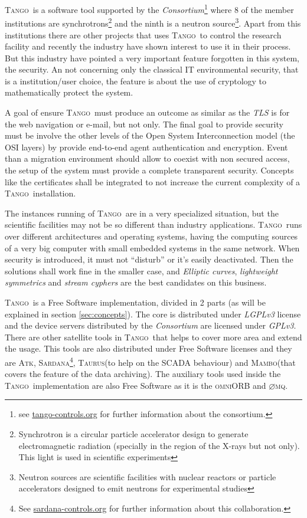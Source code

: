 \documentclass[10pt,a4paper,twoside]{llncs}
\newcommand{\tango}{\textsc{Tango}}
\newcommand{\atk}{\textsc{Atk}}
\newcommand{\sardana}{\textsc{Sardana}}
\newcommand{\taurus}{\textsc{Taurus}}
\newcommand{\mambo}{\textsc{Mambo}}
\newcommand{\omniorb}{\textsc{omniORB}}
\newcommand{\zmq}{\textsc{$\varnothing$mq}}
\begin{document}
\tango\, is a software tool supported by the \emph{Consortium}\footnote{see \href{https://www.tango-controls.org/}{tango-controls.org} for further information about the consortium.} where 8 of the member institutions are synchrotrons\footnote{Synchrotron is a circular particle accelerator design to generate electromagnetic radiation (specially in the region of the X-rays but not only). This light is used in scientific experiments} and the ninth is a neutron source\footnote{Neutron sources are scientific facilities with nuclear reactors or particle accelerators designed to emit neutrons for experimental studies}. Apart from this institutions there are other projects that uses \tango\, to control the research facility and recently the industry have shown interest to use it in their process. But this industry have pointed a very important feature forgotten in this system, the security. An not concerning only the classical IT environmental security, that is a institution/user choice, the feature is about the use 
of cryptology to mathematically protect the 
system.

A goal of ensure \tango\, must produce an outcome as similar as the \emph{TLS} is for the web navigation or e-mail, but not only. The final goal to provide security must be involve the other levels of the Open System Interconnection model (the OSI layers) by provide end-to-end agent authentication and encryption. Event than a migration environment should allow to coexist with non secured access, the setup of the system must provide a complete transparent security. Concepts like the certificates shall be integrated to not increase the current complexity of a \tango\, installation.

The instances running of \tango\, are in a very specialized situation, but the scientific facilities may not be so different than industry applications. \tango\, runs over different architectures and operating systems, having the computing sources of a very big computer with small embedded systems in the same network. When security is introduced, it must not ``disturb'' or it's easily deactivated. Then the solutions shall work fine in the smaller case, and \emph{Elliptic curves}, \emph{lightweight symmetrics} and \emph{stream cyphers} are the best candidates on this business.

\tango\, is a Free Software implementation, divided in 2 parts (as will be explained in section \ref{sec:concepts}). The core is distributed under \emph{LGPLv3} license and the device servers distributed by the \emph{Consortium} are licensed under \emph{GPLv3}. There are other satellite tools in \tango\, that helps to cover more area and extend the usage. This tools are also distributed under Free Software licenses and they are \atk, \sardana\footnote{See \href{https://www.sardana-controls.org/}{sardana-controls.org} for further information about this collaboration.}, \taurus (to help on the SCADA behaviour) and \mambo (that covers the feature of the data archiving). The auxiliary tools used inside the \tango\, implementation are also Free Software as it is the \omniorb \cite{omniORB41} and \zmq \cite{zmq32}.
\end{document}
